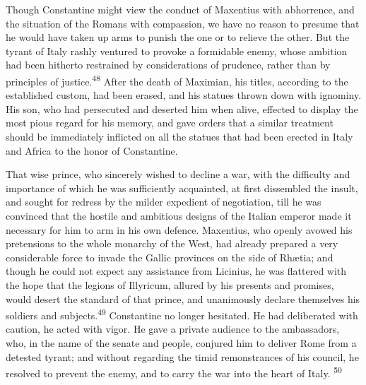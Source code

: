 

Though Constantine might view the conduct of Maxentius with
abhorrence, and the situation of the Romans with compassion, we
have no reason to presume that he would have taken up arms to
punish the one or to relieve the other. But the tyrant of Italy
rashly ventured to provoke a formidable enemy, whose ambition had
been hitherto restrained by considerations of prudence, rather
than by principles of justice.\textsuperscript{48} After the death of Maximian,
his titles, according to the established custom, had been erased,
and his statues thrown down with ignominy. His son, who had
persecuted and deserted him when alive, effected to display the
most pious regard for his memory, and gave orders that a similar
treatment should be immediately inflicted on all the statues that
had been erected in Italy and Africa to the honor of Constantine.

That wise prince, who sincerely wished to decline a war, with the
difficulty and importance of which he was sufficiently
acquainted, at first dissembled the insult, and sought for
redress by the milder expedient of negotiation, till he was
convinced that the hostile and ambitious designs of the Italian
emperor made it necessary for him to arm in his own defence.
Maxentius, who openly avowed his pretensions to the whole
monarchy of the West, had already prepared a very considerable
force to invade the Gallic provinces on the side of Rhætia; and
though he could not expect any assistance from Licinius, he was
flattered with the hope that the legions of Illyricum, allured by
his presents and promises, would desert the standard of that
prince, and unanimously declare themselves his soldiers and
subjects.\textsuperscript{49} Constantine no longer hesitated. He had deliberated
with caution, he acted with vigor. He gave a private audience to
the ambassadors, who, in the name of the senate and people,
conjured him to deliver Rome from a detested tyrant; and without
regarding the timid remonstrances of his council, he resolved to
prevent the enemy, and to carry the war into the heart of Italy. \textsuperscript{50}

